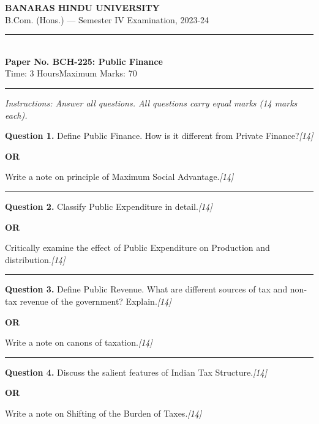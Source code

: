\documentclass[11pt,a4paper]{article}
\newcommand{\pts}[1]{\hfill   \textit{[#1]}}
\begin{document}
\begin{center}
  {\large\bfseries BANARAS HINDU UNIVERSITY}\\[2pt]
  {\normalsize B.Com. (Hons.) --- Semester IV Examination, 2023-24}\\[6pt]
  \rule{0.8\linewidth}{0.5pt}\\[6pt]
  {\large\bfseries Paper No. BCH-225: Public Finance}\\[4pt]
  {\normalsize Time: 3 Hours\hfill Maximum Marks: 70}
\end{center}

\rule{\linewidth}{0.4pt}

\smallskip



\noindent   \textit{Instructions: Answer all questions. All questions carry equal marks (14 marks each).}

\bigskip




\noindent   \textbf{Question 1.}
Define Public Finance. How is it different from Private Finance?\pts{14}

\centerline{   \textbf{OR}}

Write a note on principle of Maximum Social Advantage.\pts{14}

\medskip\rule{\linewidth}{0.2pt}




\noindent   \textbf{Question 2.}
Classify Public Expenditure in detail.\pts{14}

\centerline{   \textbf{OR}}

Critically examine the effect of Public Expenditure on Production and distribution.\pts{14}

\medskip\rule{\linewidth}{0.2pt}




\noindent   \textbf{Question 3.}
Define Public Revenue. What are different sources of tax and non-tax revenue of the government? Explain.\pts{14}

\centerline{   \textbf{OR}}

Write a note on canons of taxation.\pts{14}

\medskip\rule{\linewidth}{0.2pt}




\noindent   \textbf{Question 4.}
Discuss the salient features of Indian Tax Structure.\pts{14}

\centerline{   \textbf{OR}}

Write a note on Shifting of the Burden of Taxes.\pts{14}
\end{document}

